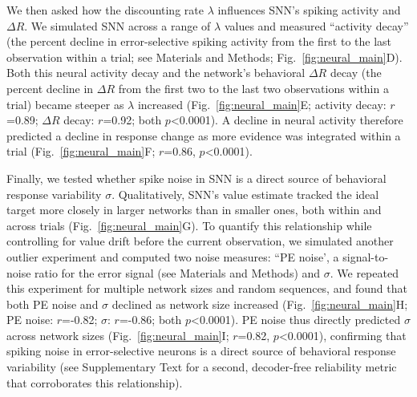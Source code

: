 \documentclass[12pt]{article}
\begin{document}
We then asked how the discounting rate $\lambda$ influences SNN's spiking activity and $\Delta R$. We simulated SNN across a range of $\lambda$ values and measured ``activity decay'' (the percent decline in error-selective spiking activity from the first to the last observation within a trial; see Materials and Methods; Fig.~\ref{fig:neural_main}D). Both this neural activity decay and the network's behavioral $\Delta R$ decay (the percent decline in $\Delta R$ from the first two to the last two observations within a trial) became steeper as $\lambda$ increased (Fig.~\ref{fig:neural_main}E; activity decay: $r$=0.89; $\Delta R$ decay: $r$=0.92; both $p$<0.0001). A decline in neural activity therefore predicted a decline in response change as more evidence was integrated within a trial (Fig.~\ref{fig:neural_main}F; $r$=0.86, $p$<0.0001).

Finally, we tested whether spike noise in SNN is a direct source of behavioral response variability $\sigma$. Qualitatively, SNN's value estimate tracked the ideal target more closely in larger networks than in smaller ones, both within and across trials (Fig.~\ref{fig:neural_main}G). To quantify this relationship while controlling for value drift before the current observation, we simulated another outlier experiment and computed two noise measures: ``PE noise', a signal-to-noise ratio for the error signal (see Materials and Methods) and $\sigma$. We repeated this experiment for multiple network sizes and random sequences, and found that both PE noise and $\sigma$ declined as network size increased (Fig.~\ref{fig:neural_main}H; PE noise: $r$=-0.82; $\sigma$: $r$=-0.86; both $p$<0.0001). PE noise thus directly predicted $\sigma$ across network sizes (Fig.~\ref{fig:neural_main}I; $r$=0.82, $p$<0.0001), confirming that spiking noise in error-selective neurons is a direct source of behavioral response variability (see Supplementary Text for a second, decoder-free reliability metric that corroborates this relationship).
\end{document}
